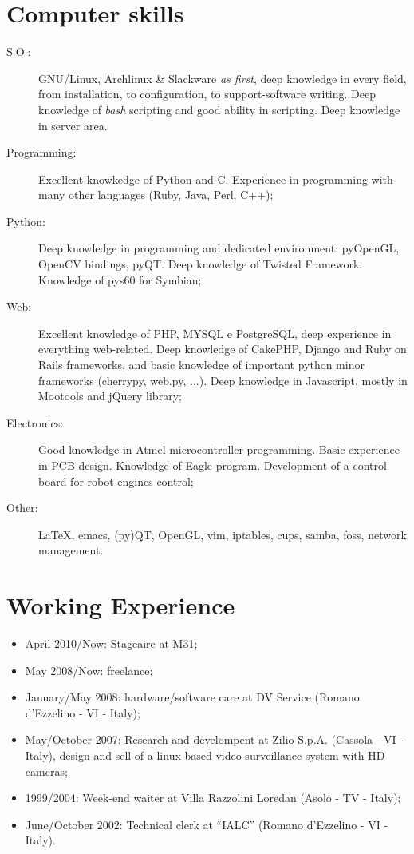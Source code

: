 \documentclass[pdftex, a4paper, 11pt]{article}
\begin{document}
\section*{Computer skills}
\begin{description}
\item[S.O.:] GNU/Linux, Archlinux \& Slackware {\em as first}, deep knowledge
  in every field, from installation, to configuration, to support-software
  writing. Deep knowledge of {\em bash} scripting and good ability in scripting.
  Deep knowledge in server area.
\item[Programming:] Excellent knowkedge of Python and C. Experience in programming
  with many other languages (Ruby, Java, Perl, C++);
\item[Python:] Deep knowledge in programming and dedicated environment: pyOpenGL,
  OpenCV bindings, pyQT. Deep knowledge of Twisted Framework. Knowledge of pys60
  for Symbian;
\item[Web:] Excellent knowledge of PHP, MYSQL e PostgreSQL, deep experience in 
  everything web-related. Deep knowledge of CakePHP, Django and Ruby on Rails frameworks,
  and basic knowledge of important python minor frameworks (cherrypy, web.py, ...). Deep
  knowledge in Javascript, mostly in Mootools and jQuery library;
\item[Electronics:] Good knowledge in Atmel microcontroller programming. Basic experience
  in PCB design. Knowledge of Eagle program. Development of a control board for robot
  engines control;
\item[Other:] \LaTeX, emacs, (py)QT, OpenGL, vim, iptables, cups,
  samba, foss, network management.
\end{description}

\section*{Working Experience}
\begin{itemize}
\item April 2010/Now: Stageaire at M31;
\item May 2008/Now: freelance;
\item January/May 2008: hardware/software care at DV Service (Romano d'Ezzelino - VI - Italy);
\item May/October 2007: Research and develompent at Zilio
  S.p.A. (Cassola - VI - Italy), design and sell of a linux-based video surveillance
  system with HD cameras;
\item 1999/2004: Week-end waiter at Villa Razzolini Loredan (Asolo - TV - Italy);
\item June/October 2002: Technical clerk at ``IALC'' (Romano d'Ezzelino - VI - Italy).
\end{itemize}
\end{document}
